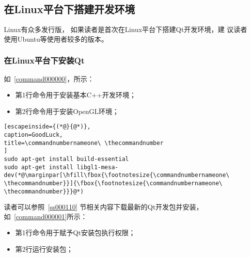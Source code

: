 ﻿




%

\FloatBarrier
\subsection{
在Linux平台下搭建开发环境
}\label{s000210}


Linux有众多发行版，
如果读者是首次在Linux平台下搭建Qt开发环境，建
议读者使用Ubuntu等使用者较多的版本。

\FloatBarrier
\subsubsection{
在Linux平台下安装Qt
}\label{ss000410}



如\commandnumbernameone\ \ref{command000000}，所示：

\begin{itemize}
\item 第1行命令用于安装基本C{\sourcefonttwo{}+}{\sourcefonttwo{}+}开发环境；
\item 第2行命令用于安装OpenGL环境；
\end{itemize}

{}\label{command000000}    %
\begin{lstlisting}[escapeinside={(*@}{@*)},
caption=GoodLuck,
title=\commandnumbernameone\ \thecommandnumber
]
sudo apt-get install build-essential
sudo apt-get install libgl1-mesa-dev(*@\marginpar[\hfill\fbox{\footnotesize{\commandnumbernameone\ \thecommandnumber}}]{\fbox{\footnotesize{\commandnumbernameone\ \thecommandnumber}}}@*)\end{lstlisting}          %
\addtocounter{lstlisting}{-1}   %


读者可以参照\ \ref{ss000110}
节相关内容下载最新的Qt开发包并安装，如\commandnumbernameone\ \ref{command000001}所示：

\begin{itemize}
\item 第1行命令用于赋予Qt安装包执行权限；
\item 第2行运行安装包；
\end{itemize}

